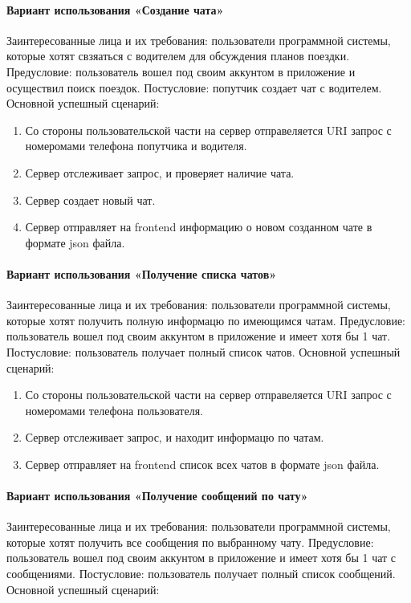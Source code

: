 \paragraph{Вариант использования «Создание чата»}
Заинтересованные лица и их требования: пользователи программной системы, которые хотят свзяаться с водителем для обсуждения планов поездки. Предусловие:  пользователь вошел под своим аккунтом в приложение и осуществил поиск поездок. Постусловие: попутчик создает чат с водителем.
Основной успешный сценарий:

\begin{enumerate}
	\item Со стороны пользовательской части на сервер отправеляется URI запрос с номеромами телефона попутчика и водителя.
	\item Сервер отслеживает запрос, и проверяет наличие чата.
	\item Сервер создает новый чат.
	\item Сервер отправляет на frontend информацию о новом созданном чате в формате json файла.
\end{enumerate}

\paragraph{Вариант использования «Получение списка чатов»}
Заинтересованные лица и их требования: пользователи программной системы, которые хотят получить полную информацю по имеющимся чатам. Предусловие:  пользователь вошел под своим аккунтом в приложение и имеет хотя бы 1 чат. Постусловие: пользователь получает полный список чатов.
Основной успешный сценарий:

\begin{enumerate}
	\item Со стороны пользовательской части на сервер отправеляется URI запрос с номеромами телефона пользователя.
	\item Сервер отслеживает запрос, и находит информацю по чатам.
	\item Сервер отправляет на frontend список всех чатов в формате json файла.
\end{enumerate}

\paragraph{Вариант использования «Получение сообщений по чату»}
Заинтересованные лица и их требования: пользователи программной системы, которые хотят получить все сообщения по выбранному чату. Предусловие:  пользователь вошел под своим аккунтом в приложение и имеет хотя бы 1 чат с сообщениями. Постусловие: пользователь получает полный список сообщений.
Основной успешный сценарий:

